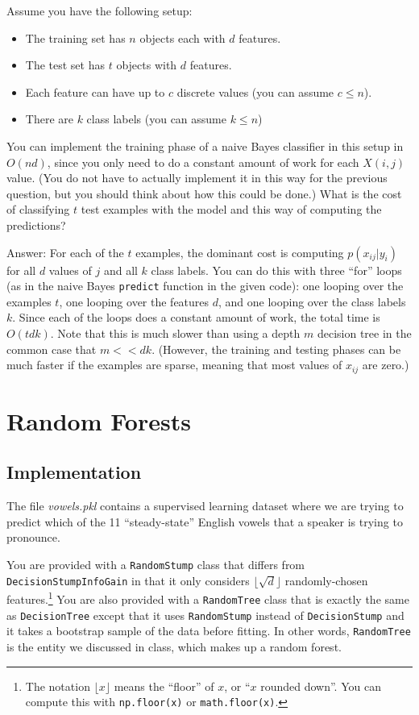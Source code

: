\documentclass{article}
\def\ans#1{\par\gre{Answer: #1}}
\def\blu#1{{\color{blu}#1}}
\def\gre#1{{\color{gre}#1}}
\def\items#1{\begin{itemize}#1\end{itemize}}
\begin{document}
	Assume you have the following setup:
	\items{
		\item The training set has $n$ objects each with $d$ features.
		\item The test set has $t$ objects with $d$ features.
		\item Each feature can have up to $c$ discrete values (you can assume $c \leq n$).
		\item There are $k$ class labels (you can assume $k \leq n$)
	}
	You can implement the training phase of a naive Bayes classifier in this setup in $O(nd)$, since you only need to do a constant amount of work for each $X(i,j)$ value. (You do not have to actually implement it in this way for the previous question, but you should think about how this could be done.)
	\blu{What is the cost of classifying $t$ test examples with the model and this way of computing the predictions?}
	\ans{
		For each of the $t$ examples, the dominant cost is computing $p(x_{ij} | y_i)$ for all $d$ values of $j$ and all $k$ class labels. You can do this with three ``for'' loops (as in the naive Bayes \texttt{predict} function in the given code): one looping over the examples $t$, one looping over the features $d$, and one looping over the class labels $k$. Since each of the loops does a constant amount of work, the total time is $O(tdk)$. Note that this is much slower than using a depth $m$ decision tree in the common case that $m << dk$. (However, the training and testing phases can be much faster if the examples are 
		{sparse}, meaning that most values of $x_{ij}$ are zero.)
	}
	
	\section{Random Forests}
	
	\subsection{Implementation}
	
	The file \emph{vowels.pkl} contains a supervised learning dataset where we are trying to predict which of the 11 ``steady-state'' English vowels that a speaker is trying to pronounce.
	
	You are provided with a \texttt{RandomStump} class that differs from
	\texttt{DecisionStumpInfoGain} in that
	it only considers $\lfloor \sqrt{d} \rfloor$ randomly-chosen features.\footnote{The notation $\lfloor x\rfloor$ means the ``floor'' of $x$, or ``$x$ rounded down''. You can compute this with \texttt{np.floor(x)} or \texttt{math.floor(x)}.}
	You are also provided with a \texttt{RandomTree} class that is exactly the same as
	\texttt{DecisionTree} except that it uses \texttt{RandomStump} instead of
	\texttt{DecisionStump} and it takes a bootstrap sample of the data before fitting.
	In other words, \texttt{RandomTree} is the entity we discussed in class, which
	makes up a random forest.
	
\end{document}
